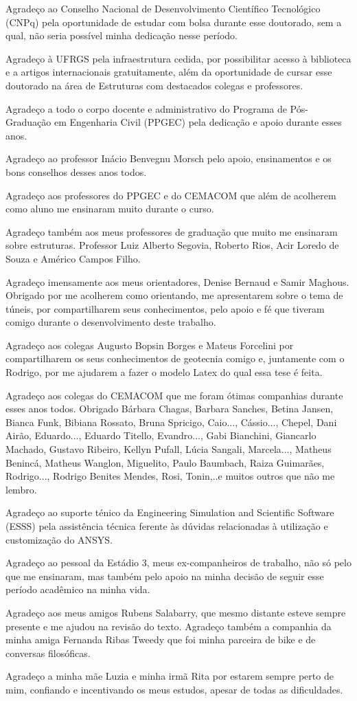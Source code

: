 Agradeço ao Conselho Nacional de Desenvolvimento Científico Tecnológico (CNPq) pela oportunidade de estudar com bolsa durante esse doutorado, sem a qual, não seria possível minha dedicação nesse período.

Agradeço à UFRGS pela infraestrutura cedida, por possibilitar acesso à biblioteca e a artigos internacionais gratuitamente, além da oportunidade de cursar esse doutorado na área de Estruturas com destacados colegas e professores.

Agradeço a todo o corpo docente e administrativo do Programa de Pós-Graduação em Engenharia Civil (PPGEC) pela dedicação e apoio durante esses anos.

Agradeço ao professor Inácio Benvegnu Morsch pelo apoio, ensinamentos e os bons conselhos desses anos todos.

Agradeço aos professores do PPGEC e do CEMACOM que além de acolherem como aluno me ensinaram muito durante o curso.

Agradeço também aos meus professores de graduação que muito me ensinaram sobre estruturas. Professor Luiz Alberto Segovia, Roberto Rios, Acir Loredo de Souza e Américo Campos Filho.

Agradeço imensamente aos meus orientadores, Denise Bernaud e Samir Maghous. Obrigado por me acolherem como orientando, me apresentarem sobre o tema de túneis, por compartilharem seus conhecimentos, pelo apoio e fé que tiveram comigo durante o desenvolvimento deste trabalho.

Agradeço aos colegas Augusto Bopsin Borges e Mateus Forcelini por compartilharem os seus conhecimentos de geotecnia comigo e, juntamente com o Rodrigo, por me ajudarem a fazer o modelo Latex do qual essa tese é feita.

Agradeço aos colegas do CEMACOM que me foram ótimas companhias durante esses anos todos. Obrigado Bárbara Chagas, Barbara Sanches, Betina Jansen, Bianca Funk, Bibiana Rossato, Bruna Spricigo, Caio..., Cássio..., Chepel, Dani Airão, Eduardo..., Eduardo Titello, Evandro..., Gabi Bianchini, Giancarlo Machado, Gustavo Ribeiro, Kellyn Pufall, Lúcia Sangali, Marcela..., Matheus Benincá, Matheus Wanglon, Miguelito, Paulo Baumbach, Raiza Guimarães, Rodrigo..., Rodrigo Benites Mendes, Rosi, Tonin,..e muitos outros que não me lembro.

Agradeço ao suporte ténico da Engineering Simulation and Scientific Software (ESSS) pela assistência técnica ferente às dúvidas relacionadas à utilização e customização do ANSYS.

Agradeço ao pessoal da Estádio 3, meus ex-companheiros de trabalho, não só pelo que me ensinaram, mas também pelo apoio na minha decisão de seguir esse período acadêmico na minha vida.

Agradeço aos meus amigos Rubens Salabarry, que mesmo distante esteve sempre presente e me ajudou na revisão do texto. Agradeço também a companhia da minha amiga Fernanda Ribas Tweedy que foi minha parceira de bike e de conversas filosóficas.

Agradeço a minha mãe Luzia e minha irmã Rita por estarem sempre perto de mim, confiando e incentivando os meus estudos, apesar de todas as dificuldades.




